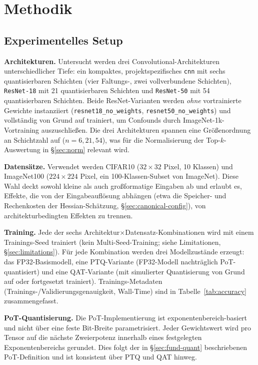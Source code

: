 \section{Methodik}
\label{sec:methodology}

\subsection{Experimentelles Setup}
\label{sec:setup}

\textbf{Architekturen.} Untersucht werden drei Convolutional-Architekturen unterschiedlicher Tiefe: ein kompaktes, projektspezifisches \texttt{cnn} mit sechs quantisierbaren Schichten (vier Faltungs-, zwei vollverbundene Schichten), \texttt{ResNet-18} \citep{he_resnet_2015} mit 21 quantisierbaren Schichten und \texttt{ResNet-50} \citep{he_resnet_2015} mit 54 quantisierbaren Schichten. Beide ResNet-Varianten werden \emph{ohne} vortrainierte Gewichte instanziiert (\texttt{resnet18\_no\_weights}, \texttt{resnet50\_no\_weights}) und vollständig von Grund auf trainiert, um Confounds durch ImageNet-1k-Vortraining auszuschließen. Die drei Architekturen spannen eine Größenordnung an Schichtzahl auf ($n=6, 21, 54$), was für die Normalisierung der Top-$k$-Auswertung in \S\ref{sec:norm} relevant wird.
\par\medskip

\textbf{Datensätze.} Verwendet werden CIFAR10 ($32\times32$ Pixel, 10 Klassen) und ImageNet100 ($224\times224$ Pixel, ein 100-Klassen-Subset von ImageNet). Diese Wahl deckt sowohl kleine als auch großformatige Eingaben ab und erlaubt es, Effekte, die von der Eingabeauflösung abhängen (etwa die Speicher- und Rechenkosten der Hessian-Schätzung, \S\ref{sec:canonical-config}), von architekturbedingten Effekten zu trennen.
\par\medskip

\textbf{Training.} Jede der sechs Architektur$\times$Datensatz-Kombinationen wird mit einem Trainings-Seed trainiert (kein Multi-Seed-Training; siehe Limitationen, \S\ref{sec:limitations}). Für jede Kombination werden drei Modellzustände erzeugt: das FP32-Basismodell, eine PTQ-Variante (FP32-Modell nachträglich PoT-quantisiert) und eine QAT-Variante (mit simulierter Quantisierung von Grund auf oder fortgesetzt trainiert). Trainings-Metadaten (Trainings-/Validierungsgenauigkeit, Wall-Time) sind in Tabelle~\ref{tab:accuracy} zusammengefasst.
\par\medskip

\textbf{PoT-Quantisierung.} Die PoT-Implementierung ist exponentenbereich-basiert und nicht über eine feste Bit-Breite parametrisiert. Jeder Gewichtswert wird pro Tensor auf die nächste Zweierpotenz innerhalb eines festgelegten Exponentenbereichs gerundet. Dies folgt der in \S\ref{sec:fund-quant} beschriebenen PoT-Definition und ist konsistent über PTQ und QAT hinweg.

